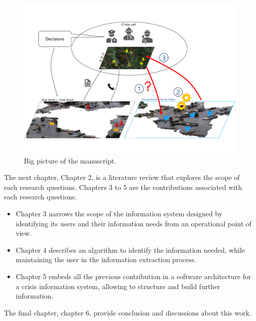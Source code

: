\begin{landscape}
    \begin{figure}
        \includegraphics[width=\paperwidth,height=\paperheight,keepaspectratio]{figures/big-picture.pdf}
        \caption{Big picture of the manuscript.}
        \label{context:big-picture}
    \end{figure}
\end{landscape}
The next chapter, Chapter 2, is a literature review that explores the scope of each research questions.
Chapters 3 to 5 are the contributions associated with each research questions.

\begin{itemize}
    \item Chapter 3 narrows the scope of the information system designed by identifying its users and their information needs from an operational point of view.
    \item Chapter 4 describes an algorithm to identify the information needed, while maintaining the user in the information extraction process.
    \item Chapter 5 embeds all the previous contribution in a software architecture for a crisis information system, allowing to structure and build further information.
\end{itemize}

The final chapter, chapter 6, provide conclusion and discussions about this work.

